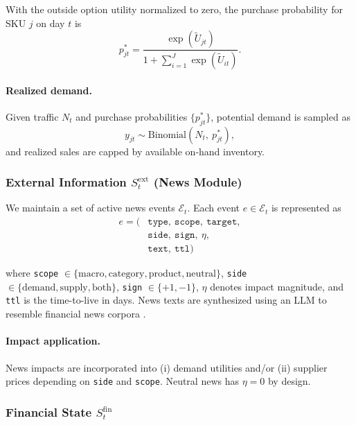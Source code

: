 With the outside option utility normalized to zero, the purchase probability for SKU $j$ on day $t$ is
\begin{equation}
p_{jt}^* =
\frac{\exp(\tilde{U}_{jt})}
{1 + \sum_{i=1}^{J}\exp(\tilde{U}_{it})}.
\end{equation}

\paragraph{Realized demand.}
Given traffic $N_t$ and purchase probabilities $\{p_{jt}^*\}$, potential demand is sampled as
\begin{equation}
y_{jt} \sim \mathrm{Binomial}(N_t,\ p_{jt}^*),
\end{equation}
and realized sales are capped by available on-hand inventory.

\subsubsection{External Information $S_t^{\text{ext}}$ (News Module)}

We maintain a set of active news events $\mathcal{E}_t$. Each event $e \in \mathcal{E}_t$ is represented as
\begin{equation}
\begin{aligned}
e = (&\texttt{type},\ \texttt{scope},\ \texttt{target},\\
     &\texttt{side},\ \texttt{sign},\ \eta,\\
     &\texttt{text},\ \texttt{ttl})
\end{aligned}
\end{equation}

where \texttt{scope} $\in \{\text{macro}, \text{category}, \text{product}, \text{neutral}\}$,
\texttt{side} $\in \{\text{demand}, \text{supply}, \text{both}\}$,
\texttt{sign} $\in \{+1,-1\}$,
$\eta$ denotes impact magnitude, and \texttt{ttl} is the time-to-live in days. News texts are synthesized using an LLM to resemble financial news corpora \citep{ashraq2025financialNewsArticles}.

\paragraph{Impact application.}
News impacts are incorporated into (i) demand utilities and/or (ii) supplier prices depending on \texttt{side} and \texttt{scope}. Neutral news has $\eta = 0$ by design.

\subsubsection{Financial State $S_t^{\text{fin}}$}


